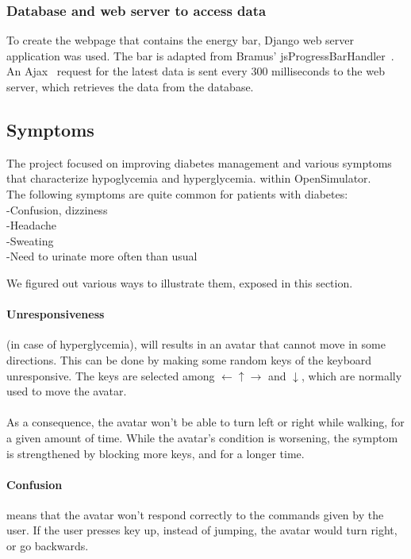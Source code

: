 \subsubsection{Database and web server to access data} 
To create the webpage that contains the energy bar, Django web server application was used. The bar is adapted from Bramus' jsProgressBarHandler~\cite{progressBarWebsite}. An Ajax~\cite{jqueryWebsite} request for the latest data is sent every 300 milliseconds to the web server, which retrieves the data from the database.

\subsection{Symptoms}

The project focused on improving diabetes management and  various symptoms that characterize hypoglycemia and hyperglycemia.  within OpenSimulator.\\
The following symptoms are quite common for patients with diabetes: \\
-Confusion, dizziness\\
-Headache\\
-Sweating\\
-Need to urinate more often than usual

We figured out various ways to illustrate them, exposed in this section.
\paragraph{Unresponsiveness} (in case of hyperglycemia), will results in an avatar that cannot move in some directions. This can be done by making some random keys of the keyboard unresponsive. The keys are selected among $\leftarrow \uparrow \rightarrow$ and $\downarrow$, which are normally used to move the avatar.
\paragraph{}As a consequence, the avatar won't be able to turn left or right while walking, for a given amount of time. 
While the avatar's condition is worsening, the symptom is strengthened by blocking more keys, and for a longer time.\\

\paragraph{Confusion} means that the avatar won't respond correctly to the commands given by the user. 
If the user presses key up, instead of jumping, the avatar would turn right, or go backwards. \\

